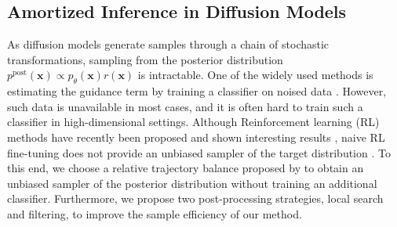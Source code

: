 \subsection{Amortized Inference in Diffusion Models}
As diffusion models generate samples through a chain of stochastic transformations, sampling from the posterior distribution $p^{\text{post}}(\mathbf{x}) \propto p_\theta(\mathbf{x})r(\mathbf{x})$ is intractable. One of the widely used methods is estimating the guidance term by training a classifier on noised data \cite{dhariwal2021diffusion, lu2023contrastive}. However, such data is unavailable in most cases, and it is often hard to train such a classifier in high-dimensional settings. Although Reinforcement learning (RL) methods have recently been proposed and shown interesting results \cite{black2024training, fan2024reinforcement}, naive RL fine-tuning does not provide an unbiased sampler of the target distribution \cite{uehara2024fine, domingo2024adjoint}. To this end, we choose a relative trajectory balance proposed by \citet{venkatraman2024amortizing} to obtain an unbiased sampler of the posterior distribution without training an additional classifier. Furthermore, we propose two post-processing strategies, local search and filtering, to improve the sample efficiency of our method.